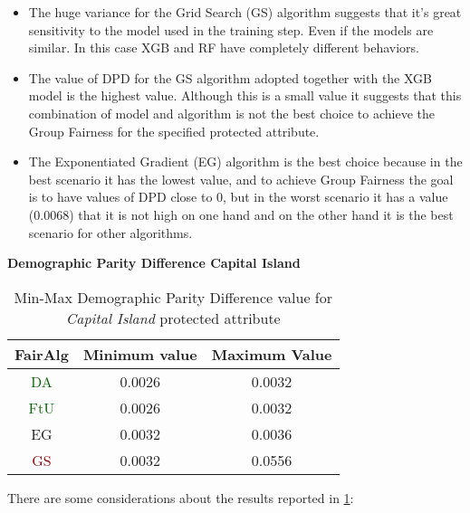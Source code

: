 \begin{itemize}
    \item The huge variance for the Grid Search (GS) algorithm suggests that it's great sensitivity to the model used in the training step. Even if the models are similar. In this case XGB and RF have completely different behaviors.

    \item The value of DPD for the GS algorithm adopted together with the XGB model is the highest value. Although this is a small value it suggests that this combination of model and algorithm is not the best choice to achieve the Group Fairness for the specified protected attribute.

    \item The Exponentiated Gradient (EG) algorithm is the best choice because in the best scenario it has the lowest value, and to achieve Group Fairness the goal is to have values of DPD close to 0, but in the worst scenario it has a value (0.0068) that it is not high on one hand and on the other hand it is the best scenario for other algorithms.

\end{itemize}


\textbf{Demographic Parity Difference Capital Island}
\begin{table}
    \centering
    \begin{tabular}{|c|c|c|}
        \hline
        \textbf{FairAlg} & \textbf{Minimum value} & \textbf{Maximum Value} \\
        \hline
        \textcolor{darkgreen}{DA} & 0.0026 & 0.0032 \\
        \hline
        \textcolor{darkgreen}{FtU} & 0.0026 & 0.0032 \\
        \hline
        EG & 0.0032 & 0.0036 \\
        \hline
        \textcolor{darkred}{GS} & 0.0032 & 0.0556 \\
        \hline
    \end{tabular}
    \caption{Min-Max Demographic Parity Difference value for \emph{Capital Island} protected attribute}
    \label{tab:ci_dpd}
\end{table}

There are some considerations about the results reported in \cref{tab:ci_dpd}:


